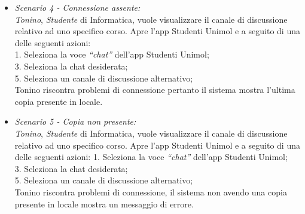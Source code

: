 \begin{itemize}
	\item \textit{Scenario 4 - Connessione assente:\\}
	\textit{Tonino}, \textit{Studente} di Informatica, vuole visualizzare il canale di discussione relativo ad uno specifico corso. Apre l’app Studenti Unimol e a seguito di una delle seguenti azioni:\\
	1. Seleziona la  voce \textit{“chat”} dell’app Studenti Unimol;\\
	3. Seleziona la chat desiderata;\\
	5. Seleziona un canale di discussione alternativo;\\
	Tonino riscontra problemi di connessione pertanto il sistema mostra l’ultima copia presente in locale.\\
	
	\item \textit{Scenario 5 - Copia non presente:\\}
	\textit{Tonino}, \textit{Studente} di Informatica, vuole visualizzare il canale di discussione relativo ad uno specifico corso. Apre l’app Studenti Unimol e a seguito di una delle seguenti azioni:
	1. Seleziona la voce \textit{“chat”} dell’app Studenti Unimol;\\
	3. Seleziona la chat desiderata;\\
	5. Seleziona un canale di discussione alternativo;\\
	Tonino riscontra problemi di connessione, il sistema non avendo una copia presente in locale mostra un messaggio di errore.\\
\end{itemize}


